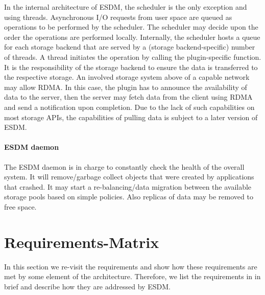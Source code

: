 In the internal architecture of ESDM, the scheduler is the only exception and using threads.
Asynchronous I/O requests from user space are queued as operations to be performed by the scheduler.
The scheduler may decide upon the order the operations are performed locally.
Internally, the scheduler hosts a queue for each storage backend that are served by a (storage backend-specific) number of threads.
A thread initiates the operation by calling the plugin-specific function.
It is the responsibility of the storage backend to ensure the data is transferred to the respective storage.
An involved storage system above of a capable network may allow RDMA.
In this case, the plugin has to announce the availability of data to the server, then the server may fetch data from the client using RDMA and send a notification upon completion.
Due to the lack of such capabilities on most storage APIs, the capabilities of pulling data is subject to a later version of ESDM.


\paragraph{ESDM daemon}

The ESDM daemon is in charge to constantly check the health of the overall system.
It will remove/garbage collect objects that were created by applications that crashed.
It may start a re-balancing/data migration between the available storage pools based on simple policies.
Also replicas of data may be removed to free space.





\section{Requirements-Matrix}
\label{seq:req matrix}
In this section we re-visit the requirements and show how these requirements are met by some element of the architecture.
Therefore, we list the requirements in  in brief and describe how they are addressed by ESDM.

